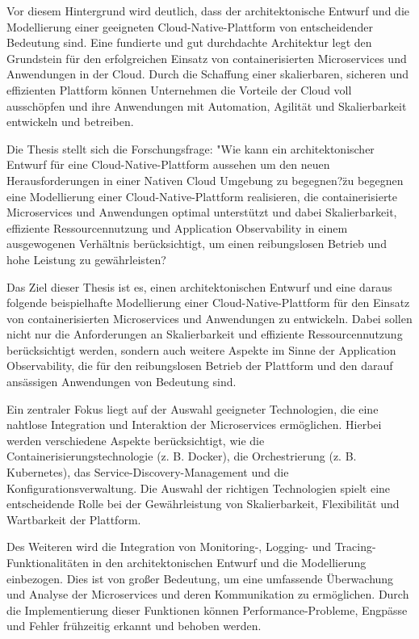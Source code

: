 Vor diesem Hintergrund wird deutlich, dass der architektonische Entwurf und die Modellierung einer geeigneten Cloud-Native-Plattform von entscheidender Bedeutung sind. Eine fundierte und gut durchdachte Architektur legt den Grundstein für den erfolgreichen Einsatz von containerisierten Microservices und Anwendungen in der Cloud. Durch die Schaffung einer skalierbaren, sicheren und effizienten Plattform können Unternehmen die Vorteile der Cloud voll ausschöpfen und ihre Anwendungen mit Automation, Agilität und Skalierbarkeit entwickeln und betreiben.

Die Thesis stellt sich die Forschungsfrage: "Wie kann ein architektonischer Entwurf für eine Cloud-Native-Plattform aussehen um den neuen Herausforderungen in einer Nativen Cloud Umgebung zu begegnen?\" zu begegnen eine Modellierung einer Cloud-Native-Plattform realisieren, die containerisierte Microservices und Anwendungen optimal unterstützt und dabei Skalierbarkeit, effiziente Ressourcennutzung und Application Observability in einem ausgewogenen Verhältnis berücksichtigt, um einen reibungslosen Betrieb und hohe Leistung zu gewährleisten?

Das Ziel dieser Thesis ist es, einen architektonischen Entwurf und eine daraus folgende beispielhafte Modellierung einer Cloud-Native-Plattform für den Einsatz von containerisierten Microservices und Anwendungen zu entwickeln. Dabei sollen nicht nur die Anforderungen an Skalierbarkeit und effiziente Ressourcennutzung berücksichtigt werden, sondern auch weitere Aspekte im Sinne der Application Observability, die für den reibungslosen Betrieb der Plattform und den darauf ansässigen Anwendungen von Bedeutung sind.

Ein zentraler Fokus liegt auf der Auswahl geeigneter Technologien, die eine nahtlose Integration und Interaktion der Microservices ermöglichen. Hierbei werden verschiedene Aspekte berücksichtigt, wie die Containerisierungstechnologie (z. B. Docker), die Orchestrierung (z. B. Kubernetes), das Service-Discovery-Management und die Konfigurationsverwaltung. Die Auswahl der richtigen Technologien spielt eine entscheidende Rolle bei der Gewährleistung von Skalierbarkeit, Flexibilität und Wartbarkeit der Plattform.

Des Weiteren wird die Integration von Monitoring-, Logging- und Tracing-Funktionalitäten in den architektonischen Entwurf und die Modellierung einbezogen. Dies ist von großer Bedeutung, um eine umfassende Überwachung und Analyse der Microservices und deren Kommunikation zu ermöglichen. Durch die Implementierung dieser Funktionen können Performance-Probleme, Engpässe und Fehler frühzeitig erkannt und behoben werden.

